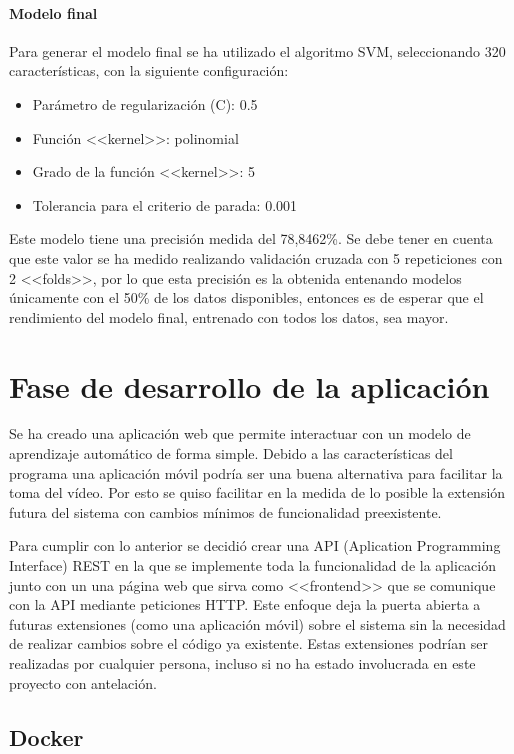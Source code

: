 \paragraph{Modelo final} Para generar el modelo final se ha utilizado el
algoritmo SVM, seleccionando 320 características, con la siguiente
configuración:

\begin{itemize}
    \item Parámetro de regularización (C): 0.5
    \item Función <<kernel>>: polinomial
    \item Grado de la función <<kernel>>: 5
    \item Tolerancia para el criterio de parada: 0.001
\end{itemize}

Este modelo tiene una precisión medida del 78,8462\%. Se debe tener en cuenta
que este valor se ha medido realizando validación cruzada con 5 repeticiones con
2 <<folds>>, por lo que esta precisión es la obtenida entenando modelos
únicamente con el 50\% de los datos disponibles, entonces es de esperar que el
rendimiento del modelo final, entrenado con todos los datos, sea mayor.

\section{Fase de desarrollo de la aplicación}

Se ha creado una aplicación web que permite interactuar con un modelo de
aprendizaje automático de forma simple. Debido a las características del
programa una aplicación móvil podría ser una buena alternativa para facilitar la
toma del vídeo. Por esto se quiso facilitar en la medida de lo posible la
extensión futura del sistema con cambios mínimos de funcionalidad preexistente.

Para cumplir con lo anterior se decidió crear una API (Aplication Programming
Interface) REST en la que se implemente toda la funcionalidad de la aplicación
junto con un una página web que sirva como <<frontend>> que se comunique con la
API mediante peticiones HTTP. Este enfoque deja la puerta abierta a futuras
extensiones (como una aplicación móvil) sobre el sistema sin la necesidad de
realizar cambios sobre el código ya existente. Estas extensiones podrían ser
realizadas por cualquier persona, incluso si no ha estado involucrada en este
proyecto con antelación.

\subsection{Docker}

